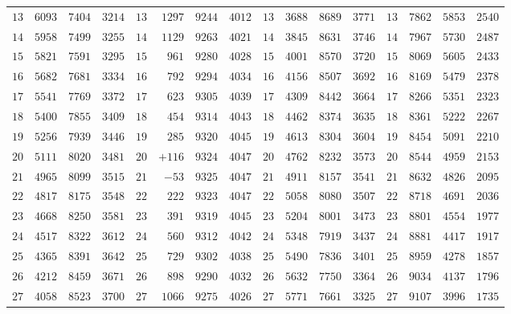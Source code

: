 \begin{GaussVISolarFrame}
\begin{tabular}{r|r|r|r||r|r|r|r||r|r|r|r||r|r|r|r}
$13$ & $6093$ & $7404$ & $3214$ & $13$ & $1297$ & $9244$ & $4012$ & $13$ & $3688$ & $8689$ & $3771$ & $13$ & $7862$ & $5853$ & $2540$\\
$14$ & $5958$ & $7499$ & $3255$ & $14$ & $1129$ & $9263$ & $4021$ & $14$ & $3845$ & $8631$ & $3746$ & $14$ & $7967$ & $5730$ & $2487$\\
$15$ & $5821$ & $7591$ & $3295$ & $15$ & $961$ & $9280$ & $4028$ & $15$ & $4001$ & $8570$ & $3720$ & $15$ & $8069$ & $5605$ & $2433$\\[3pt]
$16$ & $5682$ & $7681$ & $3334$ & $16$ & $792$ & $9294$ & $4034$ & $16$ & $4156$ & $8507$ & $3692$ & $16$ & $8169$ & $5479$ & $2378$\\
$17$ & $5541$ & $7769$ & $3372$ & $17$ & $623$ & $9305$ & $4039$ & $17$ & $4309$ & $8442$ & $3664$ & $17$ & $8266$ & $5351$ & $2323$\\
$18$ & $5400$ & $7855$ & $3409$ & $18$ & $454$ & $9314$ & $4043$ & $18$ & $4462$ & $8374$ & $3635$ & $18$ & $8361$ & $5222$ & $2267$\\
$19$ & $5256$ & $7939$ & $3446$ & $19$ & $285$ & $9320$ & $4045$ & $19$ & $4613$ & $8304$ & $3604$ & $19$ & $8454$ & $5091$ & $2210$\\
$20$ & $5111$ & $8020$ & $3481$ & $20$ & $+116$ & $9324$ & $4047$ & $20$ & $4762$ & $8232$ & $3573$ & $20$ & $8544$ & $4959$ & $2153$\\[3pt]
$21$ & $4965$ & $8099$ & $3515$ & $21$ & $-53$ & $9325$ & $4047$ & $21$ & $4911$ & $8157$ & $3541$ & $21$ & $8632$ & $4826$ & $2095$\\
$22$ & $4817$ & $8175$ & $3548$ & $22$ & $222$ & $9323$ & $4047$ & $22$ & $5058$ & $8080$ & $3507$ & $22$ & $8718$ & $4691$ & $2036$\\
$23$ & $4668$ & $8250$ & $3581$ & $23$ & $391$ & $9319$ & $4045$ & $23$ & $5204$ & $8001$ & $3473$ & $23$ & $8801$ & $4554$ & $1977$\\
$24$ & $4517$ & $8322$ & $3612$ & $24$ & $560$ & $9312$ & $4042$ & $24$ & $5348$ & $7919$ & $3437$ & $24$ & $8881$ & $4417$ & $1917$\\
$25$ & $4365$ & $8391$ & $3642$ & $25$ & $729$ & $9302$ & $4038$ & $25$ & $5490$ & $7836$ & $3401$ & $25$ & $8959$ & $4278$ & $1857$\\[3pt]
$26$ & $4212$ & $8459$ & $3671$ & $26$ & $898$ & $9290$ & $4032$ & $26$ & $5632$ & $7750$ & $3364$ & $26$ & $9034$ & $4137$ & $1796$\\
$27$ & $4058$ & $8523$ & $3700$ & $27$ & $1066$ & $9275$ & $4026$ & $27$ & $5771$ & $7661$ & $3325$ & $27$ & $9107$ & $3996$ & $1735$\\

\end{tabular}
\end{GaussVISolarFrame}
